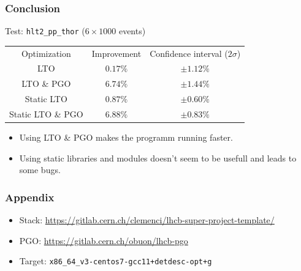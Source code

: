 \documentclass{beamer}
\begin{document}
    \begin{frame}[fragile]
        \frametitle{Conclusion}

        Test: \verb'hlt2_pp_thor' ($6 \times 1000$ events)
        \begin{center}
            \begin{tabular}{ c c c }
                Optimization & Improvement & Confidence interval ($2\sigma$) \\
                LTO & $0.17\%$ & $\pm 1.12\%$ \\
                LTO \& PGO & $6.74\%$ & $\pm 1.44\%$ \\
                Static LTO & $0.87\%$ & $\pm 0.60\%$ \\
                Static LTO \& PGO & $6.88\%$ & $\pm 0.83\%$
            \end{tabular}
        \end{center}

        \begin{itemize}
            \item Using LTO \& PGO makes the programm running faster.
            \item Using static libraries and modules doesn't seem to be usefull and leads to some bugs.
        \end{itemize}
    \end{frame}

    \appendix

    \begin{frame}[fragile]
        \frametitle{Appendix}

        \begin{itemize}
            \item Stack: \scriptsize \url{https://gitlab.cern.ch/clemenci/lhcb-super-project-template/} \normalsize
            \item PGO: \scriptsize \url{https://gitlab.cern.ch/obuon/lhcb-pgo} \normalsize
            \item Target: \verb'x86_64_v3-centos7-gcc11+detdesc-opt+g'
        \end{itemize}
    \end{frame}
\end{document}
